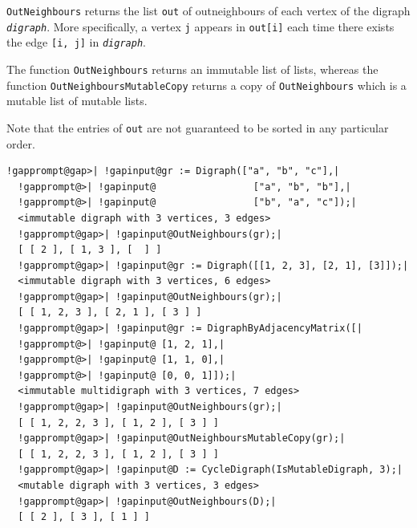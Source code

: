 \documentclass[a4paper,11pt]{report}
\begin{document}
{{{ \texttt{OutNeighbours} returns the list \texttt{out} of out\texttt{}neighbours of each vertex of the digraph \mbox{\texttt{\mdseries\slshape digraph}}.  More specifically, a vertex \texttt{j} appears in \texttt{out[i]} each time there exists the edge \texttt{[i, j]} in \mbox{\texttt{\mdseries\slshape digraph}}. 

 The function \texttt{OutNeighbours} returns an immutable list of lists, whereas the function \texttt{OutNeighboursMutableCopy} returns a copy of \texttt{OutNeighbours} which is a mutable list of mutable lists. 

 Note that the entries of \texttt{out} are not guaranteed to be sorted in any particular order. 
\begin{Verbatim}[commandchars=!@|,fontsize=\small,frame=single,label=Example]
  !gapprompt@gap>| !gapinput@gr := Digraph(["a", "b", "c"],|
  !gapprompt@>| !gapinput@                 ["a", "b", "b"],|
  !gapprompt@>| !gapinput@                 ["b", "a", "c"]);|
  <immutable digraph with 3 vertices, 3 edges>
  !gapprompt@gap>| !gapinput@OutNeighbours(gr);|
  [ [ 2 ], [ 1, 3 ], [  ] ]
  !gapprompt@gap>| !gapinput@gr := Digraph([[1, 2, 3], [2, 1], [3]]);|
  <immutable digraph with 3 vertices, 6 edges>
  !gapprompt@gap>| !gapinput@OutNeighbours(gr);|
  [ [ 1, 2, 3 ], [ 2, 1 ], [ 3 ] ]
  !gapprompt@gap>| !gapinput@gr := DigraphByAdjacencyMatrix([|
  !gapprompt@>| !gapinput@ [1, 2, 1],|
  !gapprompt@>| !gapinput@ [1, 1, 0],|
  !gapprompt@>| !gapinput@ [0, 0, 1]]);|
  <immutable multidigraph with 3 vertices, 7 edges>
  !gapprompt@gap>| !gapinput@OutNeighbours(gr);|
  [ [ 1, 2, 2, 3 ], [ 1, 2 ], [ 3 ] ]
  !gapprompt@gap>| !gapinput@OutNeighboursMutableCopy(gr);|
  [ [ 1, 2, 2, 3 ], [ 1, 2 ], [ 3 ] ]
  !gapprompt@gap>| !gapinput@D := CycleDigraph(IsMutableDigraph, 3);|
  <mutable digraph with 3 vertices, 3 edges>
  !gapprompt@gap>| !gapinput@OutNeighbours(D);|
  [ [ 2 ], [ 3 ], [ 1 ] ]
\end{Verbatim}
 }

 

}}
\end{document}
